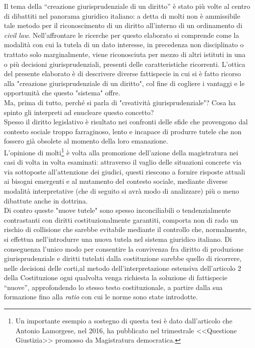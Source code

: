 Il tema della “creazione giurisprudenziale di un diritto” è stato più volte al centro di dibattiti nel panorama giuridico italiano: a detta di molti non è ammissibile tale metodo per il riconoscimento di un diritto all’interno di un ordinamento di \textit{civil law}.
Nell'affrontare le ricerche per questo elaborato si comprende come la modalità con cui la tutela di un dato interesse, in precedenza non disciplinato o trattato solo marginalmente, viene riconosciuta per mezzo di altri istituti in una o più decisioni giurisprudenziali, presenti delle caratteristiche ricorrenti. 
L’ottica del presente elaborato è di descrivere diverse fattispecie in cui si è fatto ricorso alla "creazione giurisprudenziale di un diritto", col fine di cogliere i vantaggi e le opportunità che questo "sistema" offre.
\\Ma, prima di tutto, perché si parla di "creatività giurisprudenziale"? Cosa ha spinto gli interpreti ad enucleare questo concetto?
\\Spesso il diritto legislativo è risultato nei confronti delle sfide che provengono dal contesto sociale troppo farraginoso, lento e incapace di produrre tutele che non fossero già obsolete al momento della loro emanazione. 
\\L'opinione di molti\footnote{Un importante esempio a sostegno di questa tesi è dato dall'articolo che Antonio Lamorgese, nel 2016, ha pubblicato nel trimestrale <<Questione Giustizia>> promosso da Magistratura democratica.} è volta alla promozione dell'azione della magistratura nei casi di volta in volta esaminati: attraverso il vaglio delle situazioni concrete via via sottoposte all'attenzione dei giudici, questi riescono a fornire risposte attuali ai bisogni emergenti e al mutamento del contesto sociale, mediante diverse modalità interpretative (che di seguito si avrà modo di analizzare) più o meno dibattute anche in dottrina.
\\Di contro queste "nuove tutele" sono spesso inconciliabili o tendenzialmente contrastanti con diritti costituzionalmente garantiti, comporta non di rado un rischio di collisione che sarebbe evitabile mediante il controllo che, normalmente, si effettua nell'introdurre una nuova tutela nel sistema giuridico italiano.
Di conseguenza l’unico modo per consentire la convivenza fra diritto di produzione giurisprudenziale e diritti tutelati dalla costituzione sarebbe quello di ricorrere, nelle decisioni delle corti,al metodo dell'interpretazione estensiva dell’articolo 2 della Costituzione ogni qualvolta venga richiesta la soluzione di fattispecie “nuove”, approfondendo lo stesso testo costituzionale, a partire dalla sua formazione fino alla \textit{ratio} con cui le norme sono state introdotte.
